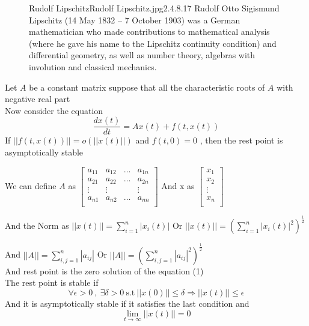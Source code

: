 \documentclass[]{article}
\begin{document}
\begin{figure}[b]
    \begin{enrichment}{Rudolf Lipschitz}{Rudolf Lipschitz.jpg}{2.4}{.8}{.17}
        Rudolf Otto Sigismund Lipschitz (14 May 1832 – 7 October 1903)
        was a German mathematician who made contributions to mathematical analysis
        (where he gave his name to the Lipschitz continuity condition) and differential geometry, as well as number theory, algebras with involution and classical mechanics.
    \end{enrichment}
\end{figure}
\setcounter{equation}{0}
\newpage
\begin{theorem}[]

    Let $A$ be a constant matrix suppose that all the characteristic roots of $A$ with negative real part
    \\
    Now consider the equation
    \[
        \frac{dx(t)}{dt} = Ax(t) + f(t,x(t))
    \]
    If $||f(t,x(t))|| = o(||x(t)||)$ and $f(t,0) = 0$ , then the rest point is asymptotically stable

    We can define $A$ as
    $\begin{bmatrix}
            a_{11} & a_{12} & \dots & a_{1n} \\
            a_{21} & a_{22} & \dots & a_{2n} \\
            \vdots & \vdots &       & \vdots \\
            a_{n1} & a_{n2} & \dots & a_{nn} \\
        \end{bmatrix}$
    And x as
    $\begin{bmatrix}
            x_{1}  \\
            x_{2}  \\
            \vdots \\
            x_{n}  \\
        \end{bmatrix}$
    \par
    And the Norm as
    \(
    \displaystyle ||x(t)|| = \sum^{n}_{i=1}|x_i(t)|
    \)
    Or
    \(
    \displaystyle  ||x(t)|| = \left(\sum^{n}_{i=1}|x_i(t)|^2\right)^{\frac{1}{2}}
    \)
    \par
    And
    \(
    \displaystyle ||A|| = \sum^{n}_{i,j=1}|a_{ij}|
    \)
    Or
    \(
    \displaystyle ||A|| = \left(\sum^{n}_{i,j=1}|a_{ij}|^2\right)^{\frac{1}{2}}
    \)
    \\
    And rest point is the zero solution of the equation (1)
    \\
    The rest point is stable if
    \[
        \forall \epsilon >0 \  , \ \exists \delta >0 \ \text{s.t} \ || x(0)|| \leq \delta \Longrightarrow
        ||x(t)|| \leq \epsilon
    \]
    And it is asymptotically stable if it satisfies the last condition and
    \[
        \lim_{t \to \infty} ||x(t)|| = 0
    \]
\end{theorem}
\end{document}
